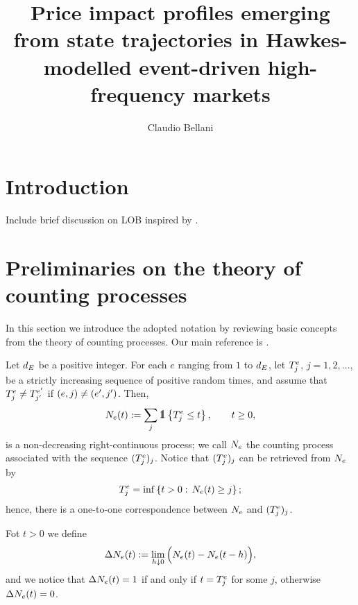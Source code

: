 \documentclass[10pt]{article}
\title{Price impact profiles emerging from state trajectories in Hawkes-modelled event-driven high-frequency markets}
\author{Claudio Bellani}
\begin{document}
 
\maketitle
\tableofcontents

\section{Introduction}
Include brief discussion on LOB inspired by \cite[Chapter 6]{FPR13mar}.
\section{Preliminaries on the theory of counting processes} 
In this section we introduce the adopted notation by reviewing basic concepts from the theory of counting processes. Our main reference is \cite[Chapter 14]{DVJ08int}.

Let $\numEventTypes$ be a positive integer. For each $e$ ranging from $1$ to $\numEventTypes$, let $\arrivalTimes_{j}$, $j=1, 2, \dots$, be a strictly increasing sequence of positive random times, and assume that $\arrivalTimes_{j}\neq\arrivalTimes[e\derivative]_{j\derivative}$ if $(e,j)\neq (e\derivative,j\derivative)$. Then, 
\begin{equation*}
 \countingProc(t):= \sum_{j} \one\left\lbrace\arrivalTimes_{j}\leq t \right\rbrace, \qquad t\geq 0,
\end{equation*}
is a non-decreasing right-continuous process; we call $\countingProc$ the counting process associated with the sequence $(\arrivalTimes_{j})_j$. Notice that $(\arrivalTimes_{j})_j$ can be retrieved from $\countingProc$ by 
\begin{equation*}
 \arrivalTimes_{j} = \inf \left\lbrace t>0: \, \countingProc(t)\geq j\right\rbrace;
\end{equation*}
hence, there is a one-to-one correspondence between $\countingProc$ and $(\arrivalTimes_{j})_j$. 

Fot $t>0$ we define 
\begin{equation*}
 \Delta\countingProc(t):= \lim_{h\downarrow 0} \Big( \countingProc(t) - \countingProc(t-h) \Big),
\end{equation*}
and we notice that $\Delta \countingProc(t) = 1$ if and only if $t=\arrivalTimes_{j}$ for some $j$, otherwise $\Delta \countingProc(t) = 0$.
\end{document}
